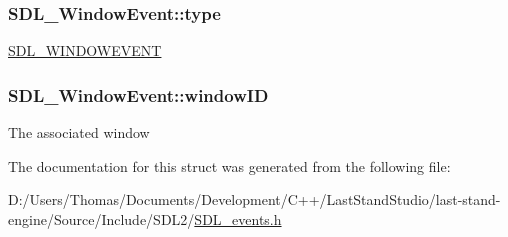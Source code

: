 \subsubsection[{type}]{ S\+D\+L\+\_\+\+Window\+Event\+::type}\label{structSDL__WindowEvent_a01c8c8fbe8564e690f958d2db560f657}
\hyperlink{SDL__events_8h_a3b589e89be6b35c02e0dd34a55f3fccaa5ff4e41f0d8b5def11cfe6a69ec0b698}{S\+D\+L\+\_\+\+W\+I\+N\+D\+O\+W\+E\+V\+E\+N\+T} \hypertarget{structSDL__WindowEvent_a4b31796ffc84fbb7f6e9ba33e127619a}{}
\subsubsection[{window\+I\+D}]{ S\+D\+L\+\_\+\+Window\+Event\+::window\+I\+D}\label{structSDL__WindowEvent_a4b31796ffc84fbb7f6e9ba33e127619a}
The associated window 

The documentation for this struct was generated from the following file\+:\begin{DoxyCompactItemize}
\item 
D\+:/\+Users/\+Thomas/\+Documents/\+Development/\+C++/\+Last\+Stand\+Studio/last-\/stand-\/engine/\+Source/\+Include/\+S\+D\+L2/\hyperlink{SDL__events_8h}{S\+D\+L\+\_\+events.\+h}\end{DoxyCompactItemize}
